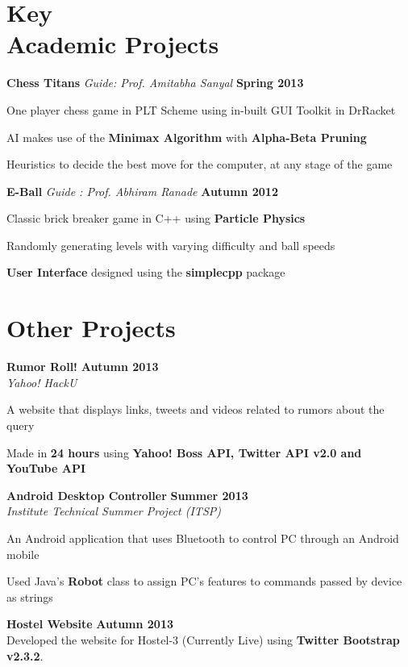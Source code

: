\documentclass[margin,11pt]{resume}
\begin{document}
\begin{resume}
    \section{\mysidestyle Key \\ Academic Projects}
    \textbf{Chess Titans}  \hspace{5em} \textsl{Guide: Prof. Amitabha Sanyal} \hspace{8em} \textbf{Spring 2013}
\vspace{-3.5mm}
\begin{list2}
\item One player chess game in PLT Scheme using in-built GUI Toolkit in DrRacket 
\item AI makes use of the \textbf{Minimax Algorithm} with \textbf{Alpha-Beta Pruning}
\item Heuristics to decide the best move for the computer, at any stage of the game
\end{list2}
\vspace{-2mm}
\textbf{E-Ball}  \hspace{8em} \textsl{Guide : Prof. Abhiram Ranade} \hspace{7em} \textbf{Autumn 2012}
\vspace{-3.5mm}
\begin{list2}
\item Classic brick breaker game in C++ using \textbf{Particle Physics} 
\item Randomly generating levels with varying difficulty and ball speeds 
\item \textbf{User Interface} designed using the \textbf{simplecpp} package
\end{list2}

\section{\mysidestyle Other Projects}
\textbf{Rumor Roll!} \hfill \textbf{Autumn 2013}\\
\textsl{Yahoo! HackU}
\begin{list2}
\item A website that displays links, tweets and videos related to rumors about the query
\item Made in \textbf{24 hours} using \textbf{Yahoo! Boss API, Twitter API v2.0 and YouTube API}
\end{list2}
\vspace{-2.5mm}
\textbf{Android Desktop Controller} \hfill \textbf{Summer 2013}\\
\textsl{Institute Technical Summer Project (ITSP)}
\begin{list2}
\item An Android application that uses Bluetooth to control PC through an Android mobile 
\item Used Java's \textbf{Robot} class to assign PC's features to commands passed by device as strings
\end{list2}
\vspace{-2.5mm}
\textbf{Hostel Website} \hfill \textbf{Autumn 2013}\\
Developed the website for Hostel-3 (Currently Live) using \textbf{Twitter Bootstrap v2.3.2}.


\end{resume}
\end{document}
